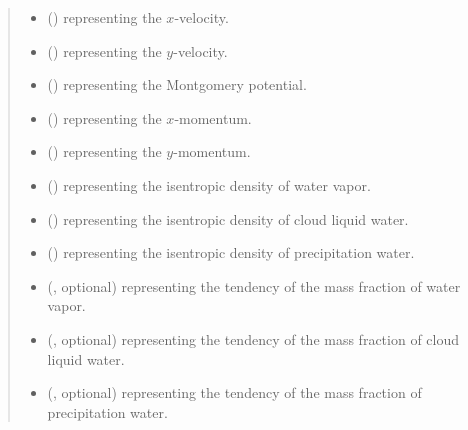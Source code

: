 \documentclass[letterpaper,10pt,english]{sphinxmanual}
\begin{document}
\begin{fulllineitems}
\begin{fulllineitems}
\begin{quote}
\begin{description}
\begin{itemize}
\item {} 
 () \textendash{}  representing the \(x\)-velocity.

\item {} 
 () \textendash{}  representing the \(y\)-velocity.

\item {} 
 () \textendash{}  representing the Montgomery potential.

\item {} 
 () \textendash{}  representing the \(x\)-momentum.

\item {} 
 () \textendash{}  representing the \(y\)-momentum.

\item {} 
 () \textendash{}  representing the isentropic density of water vapor.

\item {} 
 () \textendash{}  representing the isentropic density of cloud liquid water.

\item {} 
 () \textendash{}  representing the isentropic density of precipitation water.

\item {} 
 (, optional) \textendash{}  representing the tendency of the mass fraction of water vapor.

\item {} 
 (, optional) \textendash{}  representing the tendency of the mass fraction of cloud liquid water.

\item {} 
 (, optional) \textendash{}  representing the tendency of the mass fraction of precipitation water.


\end{itemize}
\end{description}
\end{quote}
\end{fulllineitems}
\end{fulllineitems}
\end{document}

